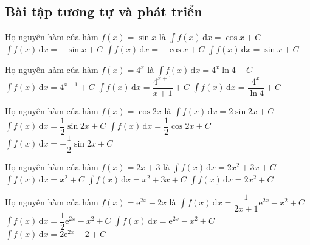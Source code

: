 \subsection{Bài tập tương tự và phát triển}
\begin{ex}%
	Họ nguyên hàm của hàm $f(x) = \sin {x}$ là 
	\choice
	{$\displaystyle\int f(x) \mathrm{\,d}x = \cos {x} + C$}	
	{$\displaystyle\int f(x) \mathrm{\,d}x = -\sin {x} + C$}
	{\True $\displaystyle\int f(x) \mathrm{\,d}x = -\cos {x} + C$}
	{$\displaystyle\int f(x) \mathrm{\,d}x = \sin {x} + C$}
\end{ex}
\begin{ex}%
	Họ nguyên hàm của hàm $f(x) = 4^{x}$ là 
	\choice
	{$\displaystyle\int f(x) \mathrm{\,d}x = 4^{x} \ln{4} + C$}	
	{$\displaystyle\int f(x) \mathrm{\,d}x = 4^{x+1} + C$}
	{ $\displaystyle\int f(x) \mathrm{\,d}x = \dfrac {4^{x+1}}{x+1} + C$}
	{\True $\displaystyle\int f(x) \mathrm{\,d}x = \dfrac {4^{x}}{\ln {4}} + C$}
\end{ex}
\begin{ex}%
	Họ nguyên hàm của hàm $f(x) = \cos {2x}$ là 
	\choice
	{$\displaystyle\int f(x) \mathrm{\,d}x = 2\sin {2x} + C$}	
	{\True $\displaystyle\int f(x) \mathrm{\,d}x = \dfrac{1}{2} \sin{2x} + C$}
	{$\displaystyle\int f(x) \mathrm{\,d}x = \dfrac {1}{2} \cos {2x} + C$}
	{$\displaystyle\int f(x) \mathrm{\,d}x = -\dfrac{1}{2} \sin {2x} + C$}
\end{ex}
\begin{ex}%
Họ nguyên hàm của hàm $f(x) = 2x +3$ là 
\choice
{$\displaystyle\int f(x) \mathrm{\,d}x = 2x^2+3x + C$}	
{$\displaystyle\int f(x) \mathrm{\,d}x = x^2 + C$}
{\True $\displaystyle\int f(x) \mathrm{\,d}x = x^2+3x + C$}
{$\displaystyle\int f(x) \mathrm{\,d}x = 2x^2 + C$}
\end{ex}
\begin{ex}%
Họ nguyên hàm của hàm $f(x) = \mathrm{e}^{2x} -2x$ là 
\choice
{$\displaystyle\int f(x) \mathrm{\,d}x = \dfrac {1}{2x+1} \mathrm {e}^{2x} - x^2 + C$}	
{\True $\displaystyle\int f(x) \mathrm{\,d}x = \dfrac {1}{2} \mathrm {e}^{2x} - x^2 + C$}
{$\displaystyle\int f(x) \mathrm{\,d}x = \mathrm {e}^{2x} - x^2 + C$}
{$\displaystyle\int f(x) \mathrm{\,d}x = 2 \mathrm {e}^{2x} - 2 + C$}
\end{ex}
